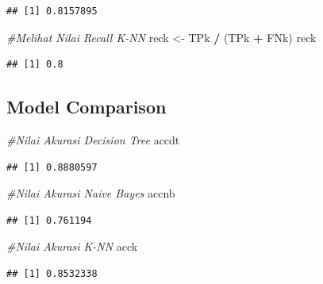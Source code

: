 \documentclass[]{article}
\newenvironment{Shaded}{\begin{snugshade}}{\end{snugshade}}
\newcommand{\CommentTok}[1]{\textcolor[rgb]{0.56,0.35,0.01}{\textit{#1}}}
\newcommand{\NormalTok}[1]{#1}
\newcommand{\OperatorTok}[1]{\textcolor[rgb]{0.81,0.36,0.00}{\textbf{#1}}}
\newcommand{\StringTok}[1]{\textcolor[rgb]{0.31,0.60,0.02}{#1}}
\begin{document}
\begin{verbatim}
## [1] 0.8157895
\end{verbatim}

\begin{Shaded}
\begin{Highlighting}[]
\CommentTok{#Melihat Nilai Recall K-NN}
\NormalTok{reck <-}\StringTok{ }\NormalTok{TPk }\OperatorTok{/}\StringTok{ }\NormalTok{(TPk }\OperatorTok{+}\StringTok{ }\NormalTok{FNk)}
\NormalTok{reck}
\end{Highlighting}
\end{Shaded}

\begin{verbatim}
## [1] 0.8
\end{verbatim}

\hypertarget{model-comparison}{%
\subsection{Model Comparison}\label{model-comparison}}

\begin{Shaded}
\begin{Highlighting}[]
\CommentTok{#Nilai Akurasi Decision Tree}
\NormalTok{accdt}
\end{Highlighting}
\end{Shaded}

\begin{verbatim}
## [1] 0.8880597
\end{verbatim}

\begin{Shaded}
\begin{Highlighting}[]
\CommentTok{#Nilai Akurasi Naive Bayes}
\NormalTok{accnb}
\end{Highlighting}
\end{Shaded}

\begin{verbatim}
## [1] 0.761194
\end{verbatim}

\begin{Shaded}
\begin{Highlighting}[]
\CommentTok{#Nilai Akurasi K-NN}
\NormalTok{acck}
\end{Highlighting}
\end{Shaded}

\begin{verbatim}
## [1] 0.8532338
\end{verbatim}
\end{document}
